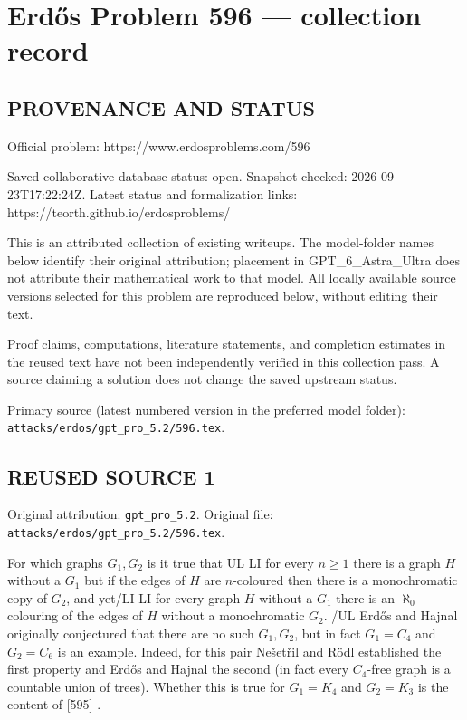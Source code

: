 \section*{Erd\H{o}s Problem 596 --- collection record}

\subsection*{PROVENANCE AND STATUS}
Official problem: https://www.erdosproblems.com/596

Saved collaborative-database status: open.
Snapshot checked: 2026-09-23T17:22:24Z.
Latest status and formalization links: https://teorth.github.io/erdosproblems/

This is an attributed collection of existing writeups. The model-folder names below identify their original attribution; placement in GPT\_6\_Astra\_Ultra does not attribute their mathematical work to that model. All locally available source versions selected for this problem are reproduced below, without editing their text.

Proof claims, computations, literature statements, and completion estimates in the reused text have not been independently verified in this collection pass. A source claiming a solution does not change the saved upstream status.

Primary source (latest numbered version in the preferred model folder): \texttt{attacks/erdos/gpt\_pro\_5.2/596.tex}.

\subsection*{REUSED SOURCE 1}
Original attribution: \texttt{gpt\_pro\_5.2}.
Original file: \texttt{attacks/erdos/gpt\_pro\_5.2/596.tex}.


For which graphs $G_1,G_2$ is it true that {UL} {LI} for every $n\geq 1$ there is a graph $H$ without a $G_1$ but if the edges of $H$ are $n$-coloured then there is a monochromatic copy of $G_2$, and yet{/LI} {LI} for every graph $H$ without a $G_1$ there is an $\aleph_0$-colouring of the edges of $H$ without a monochromatic $G_2$. {/UL} Erd\H{o}s and Hajnal originally conjectured that there are no such $G_1,G_2$, but in fact $G_1=C_4$ and $G_2=C_6$ is an example. Indeed, for this pair Ne\v{s}et\v{r}il and R\"{o}dl established the first property and Erd\H{o}s and Hajnal the second (in fact every $C_4$-free graph is a countable union of trees). Whether this is true for $G_1=K_4$ and $G_2=K_3$ is the content of [595] .

